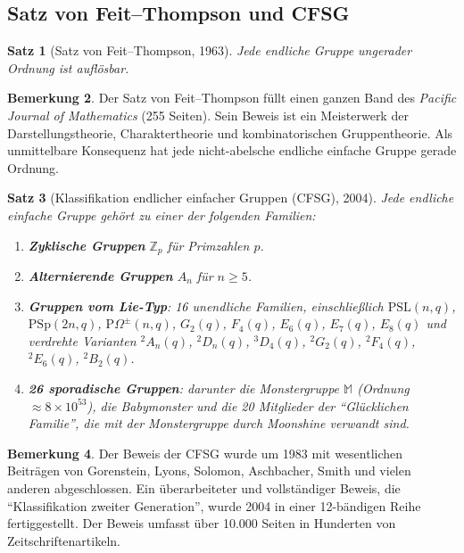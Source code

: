 \documentclass[12pt,a4paper]{amsart}
\newtheorem{theorem}{Satz}[section]
\theoremstyle{definition}
\newtheorem{remark}[theorem]{Bemerkung}
\begin{document}
\subsection{Satz von Feit--Thompson und CFSG}

\begin{theorem}[Satz von Feit--Thompson, 1963]
\label{thm:feit_thompson}
Jede endliche Gruppe ungerader Ordnung ist auflösbar.
\end{theorem}

\begin{remark}
Der Satz von Feit--Thompson füllt einen ganzen Band des \emph{Pacific Journal of
Mathematics} (255 Seiten). Sein Beweis ist ein Meisterwerk der Darstellungstheorie,
Charaktertheorie und kombinatorischen Gruppentheorie. Als unmittelbare Konsequenz
hat jede nicht-abelsche endliche einfache Gruppe gerade Ordnung.
\end{remark}

\begin{theorem}[Klassifikation endlicher einfacher Gruppen (CFSG), 2004]
\label{thm:cfsg}
Jede endliche einfache Gruppe gehört zu einer der folgenden Familien:
\begin{enumerate}[label=(\roman*)]
  \item \textbf{Zyklische Gruppen} $\mathbb{Z}_p$ für Primzahlen $p$.
  \item \textbf{Alternierende Gruppen} $A_n$ für $n \geq 5$.
  \item \textbf{Gruppen vom Lie-Typ}: 16 unendliche Familien, einschließlich
        $\mathrm{PSL}(n,q)$, $\mathrm{PSp}(2n,q)$, $\mathrm{P}\Omega^{\pm}(n,q)$,
        $G_2(q)$, $F_4(q)$, $E_6(q)$, $E_7(q)$, $E_8(q)$ und verdrehte Varianten
        ${}^2A_n(q)$, ${}^2D_n(q)$, ${}^3D_4(q)$, ${}^2G_2(q)$, ${}^2F_4(q)$,
        ${}^2E_6(q)$, ${}^2B_2(q)$.
  \item \textbf{26 sporadische Gruppen}: darunter die Monstergruppe $\mathbb{M}$
        (Ordnung $\approx 8 \times 10^{53}$), die Babymonster und die 20 Mitglieder
        der ``Glücklichen Familie'', die mit der Monstergruppe durch Moonshine
        verwandt sind.
\end{enumerate}
\end{theorem}

\begin{remark}
Der Beweis der CFSG wurde um 1983 mit wesentlichen Beiträgen von Gorenstein, Lyons,
Solomon, Aschbacher, Smith und vielen anderen abgeschlossen. Ein überarbeiteter und
vollständiger Beweis, die ``Klassifikation zweiter Generation'', wurde 2004 in einer
12-bändigen Reihe fertiggestellt. Der Beweis umfasst über 10.000 Seiten in Hunderten
von Zeitschriftenartikeln.
\end{remark}
\end{document}
